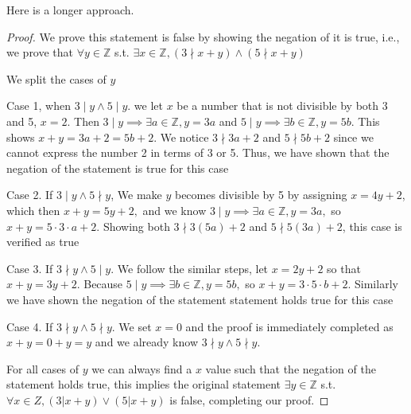 \documentclass{homework}
\theoremstyle{remark}
\newcommand{\?}{\stackrel{?}{=}}
\begin{document}
Here is a longer approach. 

\begin{proof}
    We prove this statement is false by showing the negation of it is true, i.e., we prove that $\forall y \in\mathbb{Z}$ s.t. $\exists x\in\mathbb{Z}, (3\nmid x+y)\land(5\nmid x+y)$
    
    We split the cases of $y$
    
    Case 1, when $3\mid y \land 5\mid y$. we let $x$ be a number that is not divisible by both 3 and 5, $x=2$. Then $3\mid y\implies \exists a\in\mathbb{Z},y=3a$ and $5\mid y\implies \exists b\in\mathbb{Z},y=5b.$ This shows $x+y=3a+2=5b+2$. We notice $3\nmid 3a+2$ and $5\nmid 5b+2$ since we cannot express the number 2 in terms of 3 or 5. Thus, we have shown that the negation of the statement is true for this case
    
    Case 2. If  $3\mid y\land 5\nmid y$, We make $y$ becomes divisible by 5 by assigning $x=4y+2$, which then $x+y=5y+2,$ and we know $3\mid y\implies \exists a\in\mathbb{Z},y=3a,$ so $x+y=5\cdot3\cdot a+2$. Showing both $3\nmid 3(5a)+2$ and $5\nmid 5(3a)+2$, this case is verified as true
    
    Case 3. If $3\nmid y \land 5\mid y.$ We follow the similar steps, let $x=2y+2$ so that $x+y=3y+2$. Because $5\mid y\implies \exists b\in\mathbb{Z},y=5b,$ so $x+y=3\cdot5\cdot b+2$. Similarly we have shown the negation of the statement statement holds true for this case
    
    Case 4. If $3\nmid y \land 5\nmid y$. We set $x=0$ and the proof is immediately completed as $x+y=0+y=y$ and we already know $3\nmid y \land 5\nmid y$.
    
    For all cases of $y$ we can always find a $x$ value such that the negation of the statement holds true, this implies the original statement $\exists y\in\mathbb{Z}$ s.t. $\forall x ∈ Z,(3|x+y)\lor(5|x+y)$ is false, completing our proof.
 \end{proof}
\end{document}
